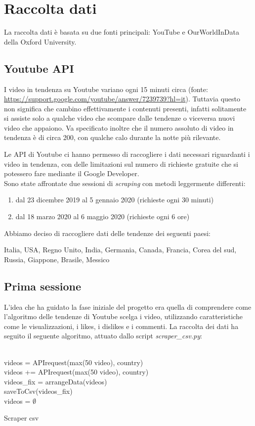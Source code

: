 \section*{Raccolta dati}
La raccolta dati è basata su due fonti principali: YouTube e OurWorldInData della Oxford University.

\subsection*{Youtube API}
I video in tendenza su Youtube variano ogni 15 minuti circa (fonte: \url{https://support.google.com/youtube/answer/7239739?hl=it}). Tuttavia questo non significa che cambino effettivamente i contenuti presenti, infatti solitamente si assiste solo a qualche video che scompare dalle tendenze o viceversa nuovi video che appaiono. Va specificato inoltre che il numero assoluto di video in tendenza è di circa 200, con qualche calo durante la notte più rilevante.

Le API di Youtube ci hanno permesso di raccogliere i dati necessari riguardanti i video in tendenza, con delle limitazioni sul numero di richieste gratuite che si potessero fare mediante il Google Developer.
\\
Sono state affrontate due sessioni di \textit{scraping} con metodi leggermente differenti:
\begin{enumerate}
	\item dal 23 dicembre 2019 al 5 gennaio 2020 (richieste ogni 30 minuti)
	\item dal 18 marzo 2020 al 6 maggio 2020 (richieste ogni 6 ore)
\end{enumerate}
Abbiamo deciso di raccogliere dati delle tendenze dei seguenti paesi:

Italia, USA, Regno Unito, India, Germania, Canada, Francia, Corea del sud, Russia, Giappone, Brasile, Messico\\

\subsection*{Prima sessione}
L'idea che ha guidato la fase iniziale del progetto era quella di comprendere come l'algoritmo delle tendenze di Youtube scelga i video, utilizzando caratteristiche come le visualizzazioni, i likes, i dislikes e i commenti. La raccolta dei dati ha seguito il seguente algoritmo, attuato dallo script \textit{scraper\_csv.py}:\\
\\
\begin{algorithm}[H]
	\nl {} {
	\nl {}
	{
		\nl videos = APIrequest(max(50 video), country)\\
		\nl {}
		{
			\nl videos += APIrequest(max(50 video), country) \\
		}
		\nl videos\_fix = arrangeData(videos)\\ 
		\nl saveToCsv(videos\_fix) \\
		\nl videos = $\emptyset$
	}
	}
	\caption{Scraper csv}
\end{algorithm}


